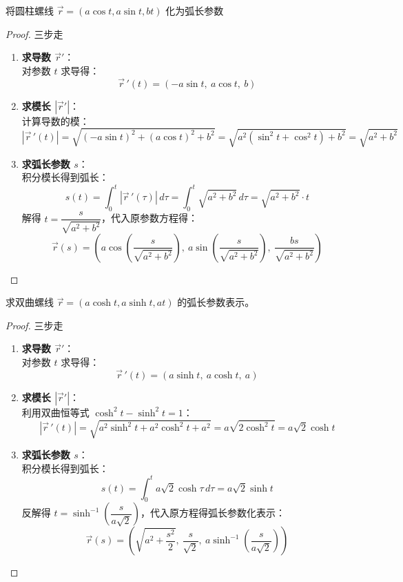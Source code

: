 \documentclass[lang=cn,10pt,thmcnt=section]{elegantbook}
\begin{document}
	\begin{example}
		将圆柱螺线 $\vec{r} = (a\cos t, a\sin t, bt)$ 化为弧长参数
	\end{example}
	\begin{proof}
		三步走
	\begin{enumerate}
		\item \textbf{求导数 $\overrightarrow{r} '$}：\\
		对参数 $t$ 求导得：
		\[
			\vec{r}\,'(t) = \left( -a\sin t,\ a\cos t,\ b \right)
		\]
		
		\item \textbf{求模长 $\left\lvert \overrightarrow{r} '\right\rvert $}：\\
		计算导数的模：
		\[
			\left\lvert \vec{r}\,'(t) \right\rvert = \sqrt{(-a\sin t)^2 + (a\cos t)^2 + b^2} = \sqrt{a^2(\sin^2 t + \cos^2 t) + b^2} = \sqrt{a^2 + b^2}
		\]
		
		\item \textbf{求弧长参数 $s$}：\\
		积分模长得到弧长：
		\[
			s(t) = \int_{0}^{t} \left\lvert \vec{r}\,'(\tau) \right\rvert \,d\tau = \int_{0}^{t} \sqrt{a^2 + b^2} \,d\tau = \sqrt{a^2 + b^2} \cdot t
		\]
		解得 $t = \dfrac{s}{\sqrt{a^2 + b^2}}$，代入原参数方程得：
		\[
			\vec{r}(s) = \left( a\cos\left(\dfrac{s}{\sqrt{a^2 + b^2}}\right),\ a\sin\left(\dfrac{s}{\sqrt{a^2 + b^2}}\right),\ \dfrac{bs}{\sqrt{a^2 + b^2}} \right)
		\]
	\end{enumerate}
	\end{proof}
	\begin{example}
		求双曲螺线 $\vec{r} = (a\cosh t, a\sinh t, at)$ 的弧长参数表示。
	\end{example}
	\begin{proof}
		三步走
		\begin{enumerate}
		\item \textbf{求导数 $\overrightarrow{r} '$}：\\
		对参数 $t$ 求导得：
		\[
			\vec{r}\,'(t) = \left( a\sinh t,\ a\cosh t,\ a \right)
		\]
		
		\item \textbf{求模长 $\left\lvert \overrightarrow{r} '\right\rvert $}：\\
		利用双曲恒等式 $\cosh^2 t - \sinh^2 t = 1$：
		\[
			\left\lvert \vec{r}\,'(t) \right\rvert = \sqrt{a^2\sinh^2 t + a^2\cosh^2 t + a^2} = a\sqrt{2\cosh^2 t} = a\sqrt{2} \cosh t
		\]
		
		\item \textbf{求弧长参数 $s$}：\\
		积分模长得到弧长：
		\[
			s(t) = \int_{0}^{t} a\sqrt{2} \cosh \tau \,d\tau = a\sqrt{2} \sinh t
		\]
		反解得 $t = \sinh^{-1}\left(\dfrac{s}{a\sqrt{2}}\right)$，代入原方程得弧长参数化表示：
		\[
			\vec{r}(s) = \left( \sqrt{a^2 + \dfrac{s^2}{2}},\ \dfrac{s}{\sqrt{2}},\ a \sinh^{-1}\left(\dfrac{s}{a\sqrt{2}}\right) \right)
		\]
	\end{enumerate}
	\end{proof}
\end{document}

